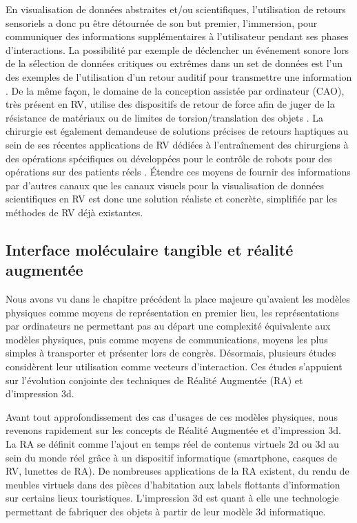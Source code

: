En visualisation de données abstraites et/ou scientifiques, l'utilisation  de retours sensoriels a donc pu être détournée de son but premier, l'immersion, pour communiquer des informations supplémentaires à l'utilisateur pendant ses phases d'interactions. La possibilité par exemple de déclencher un événement sonore lors de la sélection de données critiques ou extrêmes dans un set de données est l'un des exemples de l'utilisation d'un retour auditif pour transmettre une information \cite{ferey_multisensory_2009}. De la même façon, le domaine de la conception assistée par ordinateur (CAO), très présent en RV, utilise des dispositifs de retour de force afin de juger de la résistance de matériaux ou de limites de torsion/translation des objets \cite{sun2010haptic}. La chirurgie est également demandeuse de solutions précises de retours haptiques au sein de ses récentes applications de RV dédiées à l’entraînement des chirurgiens à des opérations spécifiques ou développées pour le contrôle de robots pour des opérations sur des patients réels \cite{kusumoto_application_2006}. Étendre ces moyens de fournir des informations par d'autres canaux que les canaux visuels pour la visualisation de données scientifiques en RV est donc une solution réaliste et concrète, simplifiée par les méthodes de RV déjà existantes.

\subsection{Interface moléculaire tangible et réalité augmentée}

Nous avons vu dans le chapitre précédent la place majeure qu'avaient les modèles physiques comme moyens de représentation en premier lieu, les représentations par ordinateurs ne permettant pas au départ une complexité équivalente aux modèles physiques, puis comme moyens de communications, moyens les plus simples à transporter et présenter lors de congrès. Désormais, plusieurs études considèrent leur utilisation comme vecteurs d'interaction. Ces études s'appuient sur l'évolution conjointe des techniques de Réalité Augmentée (RA) et d'impression 3d. 

Avant tout approfondissement des cas d'usages de ces modèles physiques, nous revenons rapidement sur les concepts de Réalité Augmentée et d'impression 3d. La RA se définit comme l'ajout en temps réel de contenus virtuels 2d ou 3d au sein du monde réel grâce à un dispositif informatique (smartphone, casques de RV, lunettes de RA). De nombreuses applications de la RA existent, du rendu de meubles virtuels dans des pièces d'habitation aux labels flottants d'information sur certains lieux touristiques. 
L'impression 3d est quant à elle une technologie permettant de fabriquer des objets à partir de leur modèle 3d informatique. 


